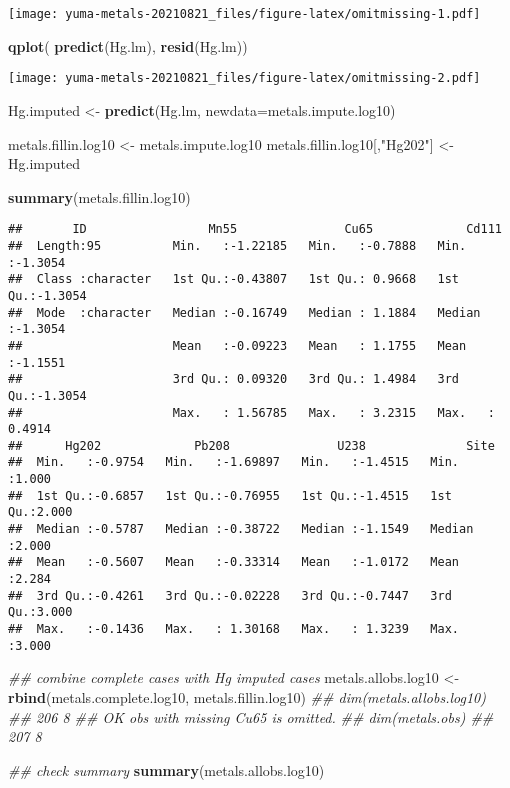 \documentclass[]{article}
\newenvironment{Shaded}{\begin{snugshade}}{\end{snugshade}}
\newcommand{\CommentTok}[1]{\textcolor[rgb]{0.56,0.35,0.01}{\textit{#1}}}
\newcommand{\DataTypeTok}[1]{\textcolor[rgb]{0.13,0.29,0.53}{#1}}
\newcommand{\KeywordTok}[1]{\textcolor[rgb]{0.13,0.29,0.53}{\textbf{#1}}}
\newcommand{\NormalTok}[1]{#1}
\newcommand{\StringTok}[1]{\textcolor[rgb]{0.31,0.60,0.02}{#1}}
\begin{document}
\texttt{[image: yuma-metals-20210821\_files/figure-latex/omitmissing-1.pdf]}

\begin{Shaded}
\begin{Highlighting}[]
\KeywordTok{qplot}\NormalTok{( }\KeywordTok{predict}\NormalTok{(Hg.lm), }\KeywordTok{resid}\NormalTok{(Hg.lm))}
\end{Highlighting}
\end{Shaded}

\texttt{[image: yuma-metals-20210821\_files/figure-latex/omitmissing-2.pdf]}

\begin{Shaded}
\begin{Highlighting}[]
\NormalTok{Hg.imputed <-}\StringTok{  }\KeywordTok{predict}\NormalTok{(Hg.lm, }\DataTypeTok{newdata=}\NormalTok{metals.impute.log10)}

\NormalTok{metals.fillin.log10 <-}\StringTok{ }\NormalTok{metals.impute.log10}
\NormalTok{metals.fillin.log10[,}\StringTok{"Hg202"}\NormalTok{] <-}\StringTok{ }\NormalTok{Hg.imputed}

\KeywordTok{summary}\NormalTok{(metals.fillin.log10)}
\end{Highlighting}
\end{Shaded}

\begin{verbatim}
##       ID                 Mn55               Cu65             Cd111        
##  Length:95          Min.   :-1.22185   Min.   :-0.7888   Min.   :-1.3054  
##  Class :character   1st Qu.:-0.43807   1st Qu.: 0.9668   1st Qu.:-1.3054  
##  Mode  :character   Median :-0.16749   Median : 1.1884   Median :-1.3054  
##                     Mean   :-0.09223   Mean   : 1.1755   Mean   :-1.1551  
##                     3rd Qu.: 0.09320   3rd Qu.: 1.4984   3rd Qu.:-1.3054  
##                     Max.   : 1.56785   Max.   : 3.2315   Max.   : 0.4914  
##      Hg202             Pb208               U238              Site      
##  Min.   :-0.9754   Min.   :-1.69897   Min.   :-1.4515   Min.   :1.000  
##  1st Qu.:-0.6857   1st Qu.:-0.76955   1st Qu.:-1.4515   1st Qu.:2.000  
##  Median :-0.5787   Median :-0.38722   Median :-1.1549   Median :2.000  
##  Mean   :-0.5607   Mean   :-0.33314   Mean   :-1.0172   Mean   :2.284  
##  3rd Qu.:-0.4261   3rd Qu.:-0.02228   3rd Qu.:-0.7447   3rd Qu.:3.000  
##  Max.   :-0.1436   Max.   : 1.30168   Max.   : 1.3239   Max.   :3.000
\end{verbatim}

\begin{Shaded}
\begin{Highlighting}[]
\CommentTok{## combine complete cases with Hg imputed cases}
\NormalTok{metals.allobs.log10 <-}\StringTok{ }\KeywordTok{rbind}\NormalTok{(metals.complete.log10, metals.fillin.log10)}
\CommentTok{## dim(metals.allobs.log10) ## 206 8  ## OK obs with missing Cu65 is omitted.}
\CommentTok{## dim(metals.obs) ## 207 8}

\CommentTok{## check summary}
\KeywordTok{summary}\NormalTok{(metals.allobs.log10)}
\end{Highlighting}
\end{Shaded}
\end{document}
